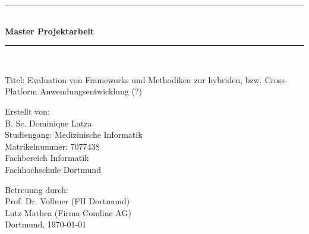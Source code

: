 \newcommand{\HRule}{\rule{\linewidth}					{0.5mm}}

\begin{titlepage}
	\begin{center}

\HRule \\[0.1cm]

\textbf{\large{
Master Projektarbeit
}}

\HRule \\[0.1cm]
\vspace{2.5cm}

\large{}
Titel: Evaluation von Frameworks und Methodiken zur hybriden, bzw. Cross-Platform Anwendungsentwicklung (?)
\vspace{2.5cm}

\large{}
Erstellt von:\\
B. Sc. Dominique Latza\\
Studiengang: Medizinische Informatik\\
Matrikelnummer: 7077438\\
Fachbereich Informatik\\
Fachhochschule Dortmund\\
\vspace{1cm}



\vspace{2.5cm}
Betreuung durch:\\
Prof. Dr. Vollmer (FH Dortmund)\\
Lutz Mathea (Firma Comline AG)\\
\vspace{1.3cm}
Dortmund, \today
		
\end{center}
\end{titlepage}
